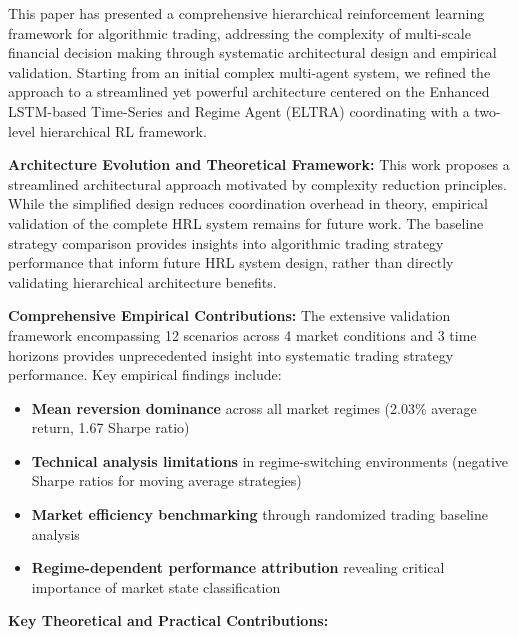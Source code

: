 \documentclass[11pt]{article}
\begin{document}
This paper has presented a comprehensive hierarchical reinforcement learning framework for algorithmic trading, addressing the complexity of multi-scale financial decision making through systematic architectural design and empirical validation. Starting from an initial complex multi-agent system, we refined the approach to a streamlined yet powerful architecture centered on the Enhanced LSTM-based Time-Series and Regime Agent (ELTRA) coordinating with a two-level hierarchical RL framework.

\textbf{Architecture Evolution and Theoretical Framework:}
This work proposes a streamlined architectural approach motivated by complexity reduction principles. While the simplified design reduces coordination overhead in theory, empirical validation of the complete HRL system remains for future work. The baseline strategy comparison provides insights into algorithmic trading strategy performance that inform future HRL system design, rather than directly validating hierarchical architecture benefits.

\textbf{Comprehensive Empirical Contributions:}
The extensive validation framework encompassing 12 scenarios across 4 market conditions and 3 time horizons provides unprecedented insight into systematic trading strategy performance. Key empirical findings include:

\begin{itemize}
\item \textbf{Mean reversion dominance} across all market regimes (2.03\% average return, 1.67 Sharpe ratio)
\item \textbf{Technical analysis limitations} in regime-switching environments (negative Sharpe ratios for moving average strategies)
\item \textbf{Market efficiency benchmarking} through randomized trading baseline analysis
\item \textbf{Regime-dependent performance attribution} revealing critical importance of market state classification

\end{itemize}
\textbf{Key Theoretical and Practical Contributions:}
\end{document}
